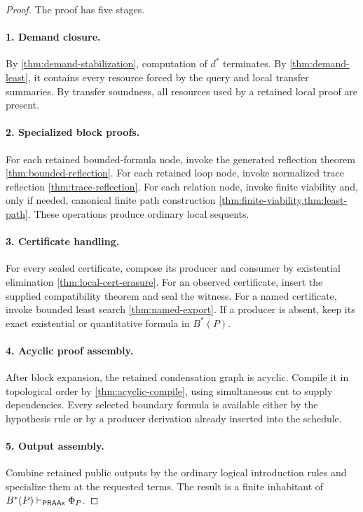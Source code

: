 \begin{proof}
The proof has five stages.

\paragraph{1. Demand closure.}
By \cref{thm:demand-stabilization}, computation of \(d^*\) terminates.  By
\cref{thm:demand-least}, it contains every resource forced by the query and
local transfer summaries.  By transfer soundness, all resources used by a
retained local proof are present.

\paragraph{2. Specialized block proofs.}
For each retained bounded-formula node, invoke the generated reflection theorem
\cref{thm:bounded-reflection}.  For each retained loop node, invoke normalized
trace reflection \cref{thm:trace-reflection}.  For each relation node, invoke
finite viability and, only if needed, canonical finite path construction
\cref{thm:finite-viability,thm:least-path}.  These operations produce ordinary
local sequents.

\paragraph{3. Certificate handling.}
For every sealed certificate, compose its producer and consumer by existential
elimination \cref{thm:local-cert-erasure}.  For an observed certificate, insert
the supplied compatibility theorem and seal the witness.  For a named
certificate, invoke bounded least search \cref{thm:named-export}.  If a
producer is absent, keep its exact existential or quantitative formula in
\(B^*(P)\).

\paragraph{4. Acyclic proof assembly.}
After block expansion, the retained condensation graph is acyclic.  Compile it
in topological order by \cref{thm:acyclic-compile}, using simultaneous cut to
supply dependencies.  Every selected boundary formula is available either by
the hypothesis rule or by a producer derivation already inserted into the
schedule.

\paragraph{5. Output assembly.}
Combine retained public outputs by the ordinary logical introduction rules and
specialize them at the requested terms.  The result is a finite inhabitant of
\(B^*(P)\vdash_{\mathsf{PRAAx}}\Phi_P\).
\end{proof}

